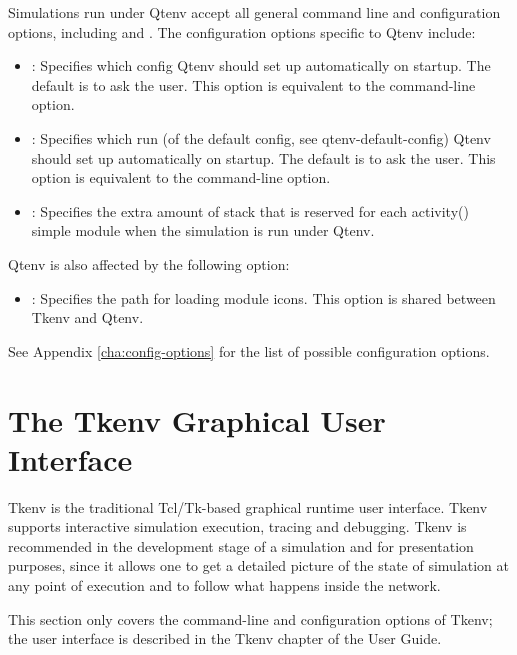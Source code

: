 Simulations run under Qtenv accept all general command line
and configuration options, including  and . 
The configuration options specific to Qtenv include:

\begin{itemize}
  \item {}:
    Specifies which config Qtenv should set up automatically on
    startup. The default is to ask the user. This option is equivalent to the
     command-line option.

  \item {}: Specifies which run (of the default
    config, see qtenv-default-config) Qtenv should set up automatically on startup.
    The default is to ask the user. This option is equivalent to the 
    command-line option.

  \item {}:
    Specifies the extra amount of stack that is reserved for each activity()
    simple module when the simulation is run under Qtenv.
\end{itemize}

Qtenv is also affected by the following option:

\begin{itemize}
  \item {}: Specifies the path for loading module icons.
  This option is shared between Tkenv and Qtenv.
\end{itemize}

See Appendix \ref{cha:config-options} for the list of possible configuration options.



\section{The Tkenv Graphical User Interface}
\label{sec:run-sim:tkenv}

Tkenv is the traditional Tcl/Tk-based graphical runtime user
interface. Tkenv supports interactive simulation execution, tracing and
debugging. Tkenv is recommended in the development stage of a simulation and for
presentation purposes, since it allows one to get a detailed picture of the state
of simulation at any point of execution and to follow what happens
inside the network.

\begin{note}
  This section only covers the command-line and configuration options
  of Tkenv; the user interface is described in the Tkenv chapter of the
  {\opp} User Guide.
\end{note}

